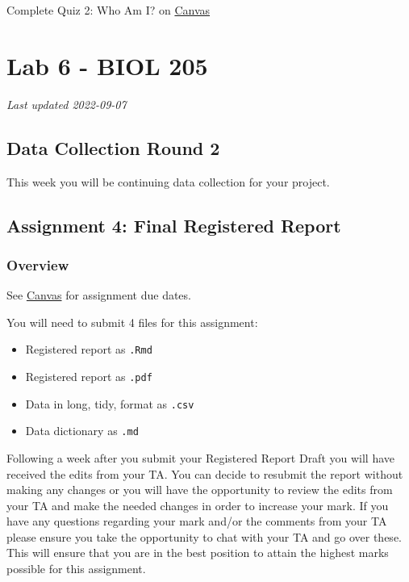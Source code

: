 \documentclass[
]{book}
\providecommand{\tightlist}{%
  \setlength{\itemsep}{0pt}\setlength{\parskip}{0pt}}
\begin{document}
Complete Quiz 2: Who Am I? on \href{https://canvas.ubc.ca/courses/113910}{Canvas}

\hypertarget{part-lab-6---biol-205}{%
\part*{Lab 6 - BIOL 205}\label{part-lab-6---biol-205}}

\emph{Last updated 2022-09-07}

\hypertarget{data-collection-round-2}{%
\chapter*{Data Collection Round 2}\label{data-collection-round-2}}

This week you will be continuing data collection for your project.

\hypertarget{assignment-4-final-registered-report}{%
\chapter*{Assignment 4: Final Registered Report}\label{assignment-4-final-registered-report}}

\hypertarget{overview-2}{%
\section*{Overview}\label{overview-2}}

See \href{https://canvas.ubc.ca}{Canvas} for assignment due dates.

You will need to submit 4 files for this assignment:

\begin{itemize}
\tightlist
\item
  Registered report as \texttt{.Rmd}
\item
  Registered report as \texttt{.pdf}
\item
  Data in long, tidy, format as \texttt{.csv}
\item
  Data dictionary as \texttt{.md}
\end{itemize}

Following a week after you submit your Registered Report Draft you will have received the edits from your TA. You can decide to resubmit the report without making any changes or you will have the opportunity to review the edits from your TA and make the needed changes in order to increase your mark. If you have any questions regarding your mark and/or the comments from your TA please ensure you take the opportunity to chat with your TA and go over these. This will ensure that you are in the best position to attain the highest marks possible for this assignment.
\end{document}

